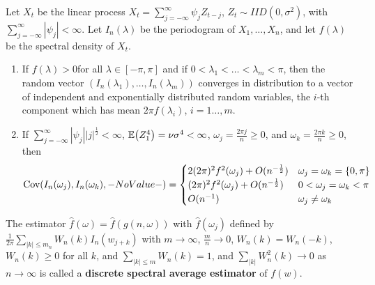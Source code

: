 \begin{thm}
  \label{sec:periodogram-4}
  Let $X_{t}$ be the linear process $X_{t} = \sum_{j=-\infty}^{\infty}
  \psi_{j} Z_{t-j}$, $Z_{t} \sim IID(0, \sigma^{2})$, with
  $\sum_{j=-\infty}^{\infty} |\psi_{j}| < \infty$. Let
  $I_{n}(\lambda)$ be the periodogram of $X_{1}, \dots, X_{n}$, and
  let $f(\lambda)$ be the spectral density of $X_{t}$.
  \begin{enumerate}
  \item If $f(\lambda) > 0$for all $\lambda \in [-\pi, \pi]$ and if $0
    < \lambda_{1} < \dots < \lambda_{m} < \pi$, then the random vector
    $(I_{n}(\lambda_{1}), \dots, I_{n}(\lambda_{m}))$ converges in
    distribution to a vector of independent and exponentially
    distributed random variables, the $i$-th component which has mean
    $2\pi f(\lambda_{i})$, $i = 1 \dots, m $.
  \item If $\sum_{j=-\infty}^{\infty} |\psi_{j}| |j|^{\frac{1}{2}} <
    \infty$, $\E{Z^{4}_{1}} = \nu \sigma^{4} < \infty$, $\omega_{j} =
    \frac{2 \pi j}{n} \geq 0$, and $\omega_{k} = \frac{2 \pi k}{n}
    \geq 0$, then
    \begin{align}
      \label{eq:75}
      \Cov{I_{n}(\omega_{j}), I_{n}(\omega_{k})} =
      \begin{cases}
        2(2 \pi)^{2} f^{2}(\omega_{j}) + O(n^{-\frac{1}{2} }) &
        \omega_{j} = \omega_{k} = \{ 0, \pi \} \\
        (2 \pi)^{2} f^{2}(\omega_{j})+ O(n^{-\frac{1}{2} }) & 0 <
        \omega_{j} = \omega_{k} < \pi \\
        O(n^{-1}) & \omega_{j} \neq \omega_{k}
      \end{cases}
    \end{align}
  \end{enumerate}

\end{thm}

\begin{defn}
  \label{sec:periodogram-3}
  The estimator $\hat f(\omega) = \hat f(g(n, \omega))$ with $\hat
  f(\omega_{j})$ defined by $\frac{1}{2 \pi} \sum_{|k| \leq m_{n}}^{}
  W_{n}(k) I_{n}(w_{j+k})$ with $m \rightarrow \infty$, $\frac{m}{n}
  \rightarrow 0$, $W_{n}(k) = W_{n}(-k)$, $W_{n}(k) \geq 0$ for all
  $k$, and $\sum_{|k| \leq m}^{} W_{n}(k) = 1$, and $\sum_{|k|}^{}
  W_{n}^{2}(k) \rightarrow 0$ as $n \rightarrow \infty$ is called a
  \textbf{discrete spectral average estimator} of $f(w)$.
\end{defn}

